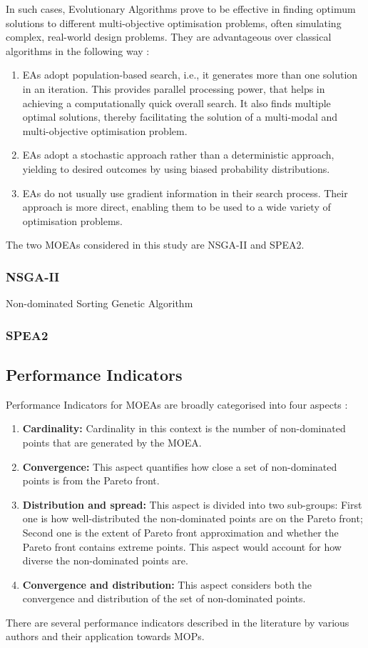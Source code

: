 \documentclass[sigconf,nonacm]{acmart}
\begin{document}
In such cases, Evolutionary Algorithms prove to be effective in finding optimum solutions to different multi-objective optimisation problems, often simulating complex, real-world design problems. They are advantageous over classical algorithms in the following way \cite{branke2008}:
\begin{enumerate}
\item EAs adopt population-based search, i.e., it generates more than one solution in an iteration. This provides parallel processing power, that helps in achieving a computationally quick overall search. It also finds multiple optimal solutions, thereby facilitating the solution of a multi-modal and multi-objective optimisation problem.
\item EAs adopt a stochastic approach rather than a deterministic approach, yielding to desired outcomes by using biased probability distributions.
\item EAs do not usually use gradient information in their search process. Their approach is more direct, enabling them to be used to a wide variety of optimisation problems.
\end{enumerate}

The two MOEAs considered in this study are NSGA-II and SPEA2.
\subsubsection{NSGA-II}
Non-dominated Sorting Genetic Algorithm
\subsubsection{SPEA2}
\subsection{Performance Indicators} \label{sec:Background_PI}
Performance Indicators for MOEAs are broadly categorised into four aspects \cite{audet2021}:
\begin{enumerate}
\item\textbf{Cardinality:} Cardinality in this context is the number of non-dominated points that are generated by the MOEA.
\item\textbf{Convergence:} This aspect quantifies how close a set of non-dominated points is from the Pareto front.
\item\textbf{Distribution and spread:} This aspect is divided into two sub-groups: First one is how well-distributed the non-dominated points are on the Pareto front; Second one is the extent of Pareto front approximation and whether the Pareto front contains extreme points. This aspect would account for how diverse the non-dominated points are.
\item\textbf{Convergence and distribution:} This aspect considers both the convergence and distribution of the set of non-dominated points.
\end{enumerate}
There are several performance indicators described in the literature by various authors and their application towards MOPs. \\
\end{document}
